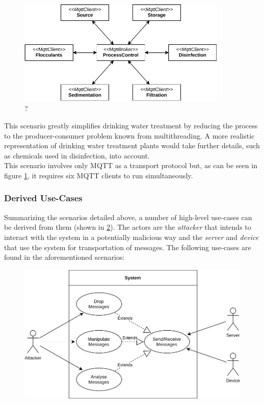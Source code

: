 \begin{figure}[h!]
    \centering
    \includegraphics[width=10cm]{img/ch04/Scenario_WTP.pdf}
    \caption[?]{?}
    \label{fig:arch-water-treatment}
\end{figure}
This scenario greatly simplifies drinking water treatment by reducing the process to the producer-consumer problem known from multithreading. A more realistic representation of drinking water treatment plants would take further details, such as chemicals used in disinfection, into account.\\ %
This scenario involves only \ac{MQTT} as a transport protocol but, as can be seen in figure \ref{fig:arch-water-treatment}, it requires six \ac{MQTT} clients to run simultaneously.

\subsubsection{Derived Use-Cases} Summarizing the scenarios detailed above, a number of high-level use-cases can be derived from them (shown in \ref{fig:use-cases-scenarios}). The actors are the \emph{attacker} that intends to interact with the system in a potentially malicious way and the \emph{server} and \emph{device} that use the system for transportation of messages. The following use-cases are found in the aforementioned scenarios:

\begin{figure}[h]
    \centering
    \includegraphics[width=14cm]{img/ch04/UseCases_Scenarios.pdf}
    \label{fig:use-cases-scenarios}
\end{figure}


